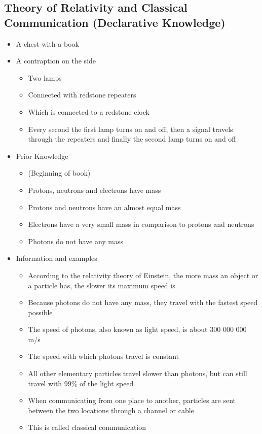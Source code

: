 \documentclass[11pt,twoside]{report} %
\begin{document}
\subsection{Theory of Relativity and Classical Communication (Declarative Knowledge)}
\begin{itemize}
	\item A chest with a book
	\item A contraption on the side
	\begin{itemize}
		\item Two lamps
		\item Connected with redstone repeaters
		\item Which is connected to a redstone clock
		\item Every second the first lamp turns on and off, then a signal travels through the repeaters and finally the second lamp turns on and off
	\end{itemize}
	\item Prior Knowledge
	\begin{itemize}
		\item (Beginning of book)
		\item Protons, neutrons and electrons have mass
		\item Protons and neutrons have an almost equal mass
		\item Electrons have a very small mass in comparison to protons and neutrons
		\item Photons do not have any mass
	\end{itemize}
	\item Information and examples
	\begin{itemize}
		\item According to the relativity theory of Einstein, the more mass an object or a particle has, the slower its maximum speed is
		\item Because photons do not have any mass, they travel with the fastest speed possible
		\item The speed of photons, also known as light speed, is about 300 000 000 m/s
		\item The speed with which photons travel is constant
		\item All other elementary particles travel slower than photons, but can still travel with 99\% of the light speed
		\item When communicating from one place to another, particles are sent between the two locations through a channel or cable
		\item This is called classical communication

\end{itemize}
\end{itemize}
\end{document}

